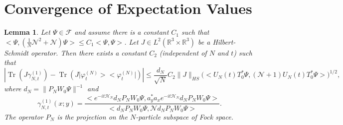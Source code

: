\documentclass[11pt,a4paper,draft,DIV11]{scrartcl}	%
\newtheorem{lem}[thm]{Lemma}
\newcommand{\fock}{\mathcal{F}}		%
\newcommand{\Ncal}{\mathcal{N}}		%
\newcommand{\Hcal}{\mathcal{H}}		%
\newcommand{\scal}[2]{\big<#1,#2\big>} %
\newcommand{\Rbb}{\mathbb{R}}		%
\newcommand{\norm}[1]{\lVert#1\rVert}	%
\newcommand{\ph}{\varphi_t^{(N)}}	%
\newcommand{\project}[1]{\lvert #1 \big>\big< #1\rvert}	%
\newcommand{\Tr}{\operatorname{Tr}}	%
\newcommand{\bd}{\begin{displaymath}}			%
\newcommand{\ed}{\end{displaymath}}
\begin{document}
\section{Convergence of Expectation Values}
\begin{lem}
\label{lem:TrJ}
Let $\Psi \in \fock$ and assume there is a constant $C_1$ such that $\scal{\Psi}{\left(\frac{1}{N}\Ncal^2 + \Ncal\right)\Psi} \leq C_1 \scal{\Psi}{\Psi}$. Let $J \in L^2(\Rbb^3 \times \Rbb^3)$ be a Hilbert-Schmidt operator. Then there exists a constant $C_2$ (independent of $N$ and $t$) such that
\bd
\left\lvert \Tr\left(J \gamma_{N,t}^{(1)} \right) - \Tr\left( J \project{\ph}  \right) \right\rvert \leq \frac{d_N}{\sqrt{N}}C_2 \norm{J}_{HS} \Big( \scal{U_N(t) T^\ast_0 \Psi}{\left( \Ncal+1 \right)U_N(t) T^\ast_0 \Psi} \Big)^{1/2},
\ed
where $d_N = \norm{P_N W_0\Psi}^{-1}$ and 
\bd
\gamma_{N,t}^{(1)}(x;y) = \frac{\scal{e^{-it \Hcal_N} d_N P_N W_0 \Psi}{a^\ast_y a_x e^{-it \Hcal_N} d_N P_N W_0 \Psi}}{\scal{d_N P_N W_0 \Psi}{\Ncal d_N P_N W_0 \Psi}}.
\ed
The operator $P_N$ is the projection on the $N$-particle subspace of Fock space.
%
\end{lem}
\end{document}
